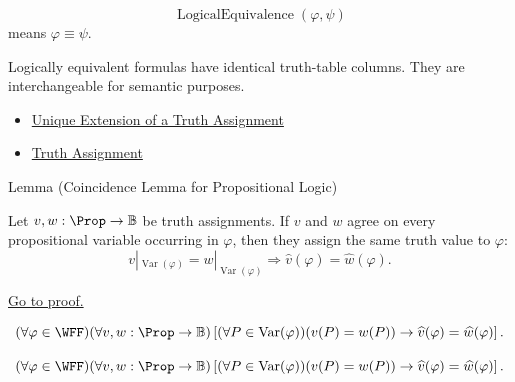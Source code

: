 \begin{remark*}
\[
\operatorname{LogicalEquivalence}(\varphi,\psi)
\]
means \(\varphi\equiv\psi\).
\end{remark*}

\begin{remark*}[Interpretation]
Logically equivalent formulas have identical truth-table columns. They are interchangeable for semantic purposes.
\end{remark*}

\begin{dependencies}
\begin{itemize}
  \item \hyperref[thm:unique-extension-truth-assignment-propositional-logic]{Unique Extension of a Truth Assignment}
  \item \hyperref[def:truth-assignment-propositional-logic]{Truth Assignment}
\end{itemize}
\end{dependencies}
\begin{lemmabox}{Lemma (Coincidence Lemma for Propositional Logic)}
\begin{lemma}
\label{lem:coincidence-lemma-propositional-logic}
Let \(v,w:\Prop\to\mathbb{B}\) be truth assignments. If \(v\) and \(w\) agree on every propositional variable occurring in \(\varphi\), then they assign the same truth value to \(\varphi\):
\[
v|_{\operatorname{Var}(\varphi)}
=
w|_{\operatorname{Var}(\varphi)}
\Longrightarrow
\widehat v(\varphi)=\widehat w(\varphi).
\]

\noindent\hyperref[prf:coincidence-lemma-propositional-logic]{Go to proof.}
\end{lemma}
\end{lemmabox}
\begin{remark*}
\[
(\forall\varphi\in\WFF)
(\forall v,w:\Prop\to\mathbb{B})
\left[
(\forall P\in\operatorname{Var}(\varphi))(v(P)=w(P))
\to
\widehat v(\varphi)=\widehat w(\varphi)
\right].
\]
\end{remark*}

\begin{remark*}
\[
(\forall\varphi\in\WFF)
(\forall v,w:\Prop\to\mathbb{B})
\left[
(\forall P\in\operatorname{Var}(\varphi))(v(P)=w(P))
\to
\widehat v(\varphi)=\widehat w(\varphi)
\right].
\]
\end{remark*}




